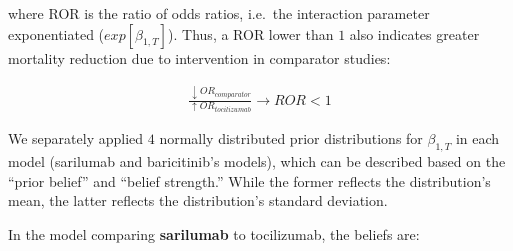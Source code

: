 \documentclass[
  12pt,
]{article}
\begin{document}
where ROR is the ratio of odds ratios, i.e.~the interaction parameter
exponentiated (\(exp[\beta_{1, T}]\)). Thus, a ROR lower than \(1\) also
indicates greater mortality reduction due to intervention in comparator
studies:

\begin{align*}
\frac {\downarrow OR_{comparator}}{\uparrow OR_{tocilizumab}} \rightarrow ROR < 1
\end{align*}

We separately applied \(4\) normally distributed prior distributions for
\(\beta_{1, T}\) in each model (sarilumab and baricitinib's models),
which can be described based on the ``prior belief'' and ``belief
strength.'' While the former reflects the distribution's mean, the
latter reflects the distribution's standard deviation.

In the model comparing \textbf{sarilumab} to tocilizumab, the beliefs
are:
\end{document}
